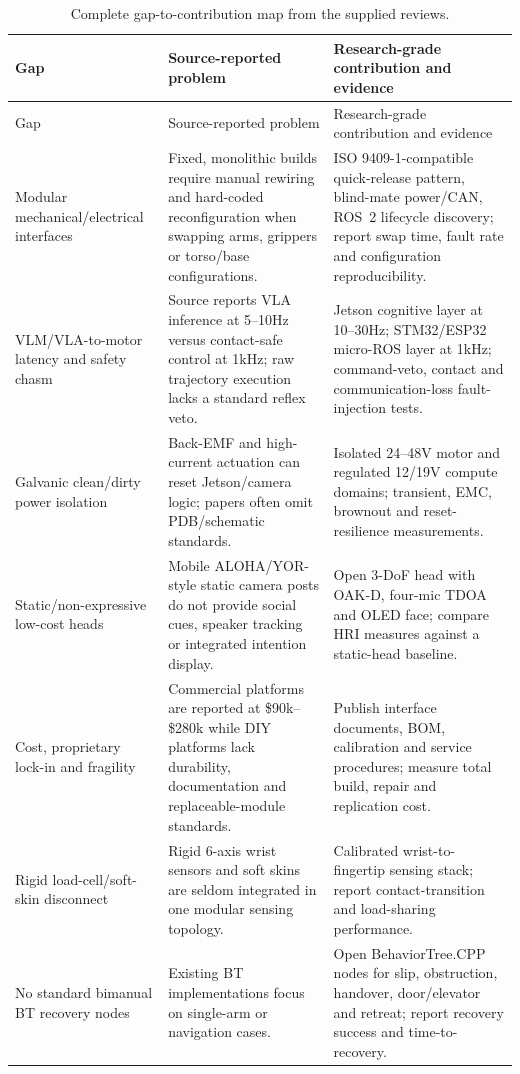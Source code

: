 \documentclass[10pt,a4paper]{article}
\begin{document}
\begin{longtable}{@{}p{}p{}p{}@{}}
\caption{Complete gap-to-contribution map from the supplied reviews.}\label{tab:gaps}\\
\toprule
Gap & Source-reported problem & Research-grade contribution and evidence \\
\midrule
\endfirsthead
\toprule
Gap & Source-reported problem & Research-grade contribution and evidence \\
\midrule
\endhead
Modular mechanical/electrical interfaces & Fixed, monolithic builds require manual rewiring and hard-coded reconfiguration when swapping arms, grippers or torso/base configurations. & ISO 9409-1-compatible quick-release pattern, blind-mate power/CAN, ROS~2 lifecycle discovery; report swap time, fault rate and configuration reproducibility. \\
VLM/VLA-to-motor latency and safety chasm & Source reports VLA inference at 5--10Hz versus contact-safe control at 1kHz; raw trajectory execution lacks a standard reflex veto. & Jetson cognitive layer at 10--30Hz; STM32/ESP32 micro-ROS layer at 1kHz; command-veto, contact and communication-loss fault-injection tests. \\
Galvanic clean/dirty power isolation & Back-EMF and high-current actuation can reset Jetson/camera logic; papers often omit PDB/schematic standards. & Isolated 24--48V motor and regulated 12/19V compute domains; transient, EMC, brownout and reset-resilience measurements. \\
Static/non-expressive low-cost heads & Mobile ALOHA/YOR-style static camera posts do not provide social cues, speaker tracking or integrated intention display. & Open 3-DoF head with OAK-D, four-mic TDOA and OLED face; compare HRI measures against a static-head baseline. \\
Cost, proprietary lock-in and fragility & Commercial platforms are reported at \$90k--\$280k while DIY platforms lack durability, documentation and replaceable-module standards. & Publish interface documents, BOM, calibration and service procedures; measure total build, repair and replication cost. \\
Rigid load-cell/soft-skin disconnect & Rigid 6-axis wrist sensors and soft skins are seldom integrated in one modular sensing topology. & Calibrated wrist-to-fingertip sensing stack; report contact-transition and load-sharing performance. \\
No standard bimanual BT recovery nodes & Existing BT implementations focus on single-arm or navigation cases. & Open BehaviorTree.CPP nodes for slip, obstruction, handover, door/elevator and retreat; report recovery success and time-to-recovery. \\

\end{longtable}
\end{document}
